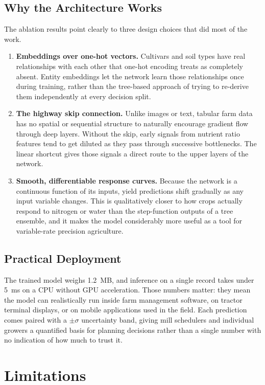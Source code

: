 \documentclass[conference,10pt,letterpaper]{IEEEtran}
\begin{document}
\subsection{Why the Architecture Works}
The ablation results point clearly to three design choices that did most of the work.
\begin{enumerate}
    \item \textbf{Embeddings over one-hot vectors.} Cultivars and soil types have real relationships with each other that one-hot encoding treats as completely absent. Entity embeddings let the network learn those relationships once during training, rather than the tree-based approach of trying to re-derive them independently at every decision split.
    \item \textbf{The highway skip connection.} Unlike images or text, tabular farm data has no spatial or sequential structure to naturally encourage gradient flow through deep layers. Without the skip, early signals from nutrient ratio features tend to get diluted as they pass through successive bottlenecks. The linear shortcut gives those signals a direct route to the upper layers of the network.
    \item \textbf{Smooth, differentiable response curves.} Because the network is a continuous function of its inputs, yield predictions shift gradually as any input variable changes. This is qualitatively closer to how crops actually respond to nitrogen or water than the step-function outputs of a tree ensemble, and it makes the model considerably more useful as a tool for variable-rate precision agriculture.
\end{enumerate}

\subsection{Practical Deployment}
The trained model weighs 1.2~MB, and inference on a single record takes under 5~ms on a CPU without GPU acceleration. Those numbers matter: they mean the model can realistically run inside farm management software, on tractor terminal displays, or on mobile applications used in the field. Each prediction comes paired with a $\pm\sigma$ uncertainty band, giving mill schedulers and individual growers a quantified basis for planning decisions rather than a single number with no indication of how much to trust it.

\section{Limitations}
\end{document}
